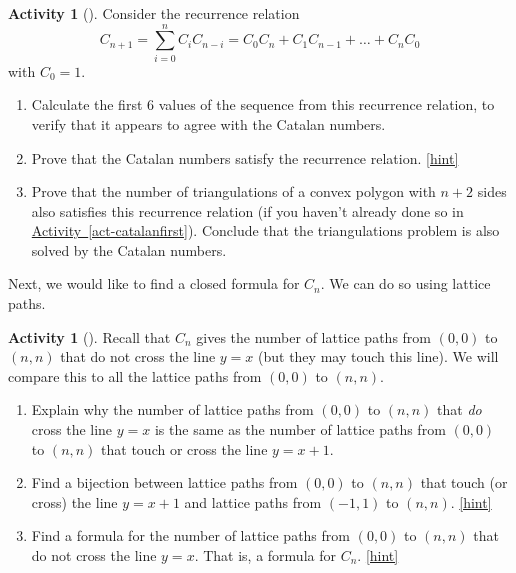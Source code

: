 \documentclass[10pt,]{book}
\theoremstyle{plain}
\theoremstyle{definition}
\theoremstyle{definition}
\theoremstyle{definition}
\newtheorem{activity}[project]{Activity}
\numberwithin{equation}{chapter}
\begin{document}
\begin{activity}[]\label{activity-174}
\hypertarget{p-1020}{}%
Consider the recurrence relation%
\begin{equation*}
C_{n + 1} = \sum_{i = 0}^n C_iC_{n-i} = C_{0}C_{n} + C_{1}C_{n - 1} + \ldots + C_{n}C_{0}
\end{equation*}
with \(C_0 = 1\).%
\begin{enumerate}[font=\bfseries,label=(\alph*),ref=\alph*]
\item\label{task-189} \hypertarget{p-1021}{}%
Calculate the first 6 values of the sequence from this recurrence relation, to verify that it appears to agree with the Catalan numbers.%
\item\label{task-190} \hypertarget{p-1022}{}%
Prove that the Catalan numbers satisfy the recurrence relation.%
\hfill{\tiny\hyperlink{a-181.b}{[hint]}\hypertarget{q-181.b}{}}\item\label{task-191} \hypertarget{p-1024}{}%
Prove that the number of triangulations of a convex polygon with \(n+2\) sides also satisfies this recurrence relation (if you haven't already done so in \hyperref[act-catalanfirst]{Activity~\ref{act-catalanfirst}}).  Conclude that the triangulations problem is also solved by the Catalan numbers.%
\end{enumerate}
\end{activity}
\hypertarget{p-1025}{}%
Next, we would like to find a closed formula for \(C_n\).  We can do so using lattice paths.%
\begin{activity}[]\label{activity-175}
\hypertarget{p-1026}{}%
Recall that \(C_n\) gives the number of lattice paths from \((0,0)\) to \((n,n)\) that do not cross the line \(y = x\) (but they may touch this line).  We will compare this to all the lattice paths from \((0,0)\) to \((n,n)\).%
\begin{enumerate}[font=\bfseries,label=(\alph*),ref=\alph*]
\item\label{task-192} \hypertarget{p-1027}{}%
Explain why the number of lattice paths from \((0,0)\) to \((n,n)\) that \emph{do} cross the line \(y = x\) is the same as the number of lattice paths from \((0,0)\) to \((n,n)\) that touch or cross the line \(y = x + 1\).%
\item\label{task-193} \hypertarget{p-1029}{}%
Find a bijection between lattice paths from \((0,0)\) to \((n,n)\) that touch (or cross) the line \(y=x+1\) and lattice paths from \((-1,1)\) to \((n,n)\).%
\hfill{\tiny\hyperlink{a-182.b}{[hint]}\hypertarget{q-182.b}{}}\item\label{task-194} \hypertarget{p-1032}{}%
Find a formula for the number of lattice paths from \((0,0)\) to \((n,n)\) that do not cross the line \(y=x\). That is, a formula for \(C_n\).%
\hfill{\tiny\hyperlink{a-182.c}{[hint]}\hypertarget{q-182.c}{}}\end{enumerate}
\end{activity}
\end{document}
